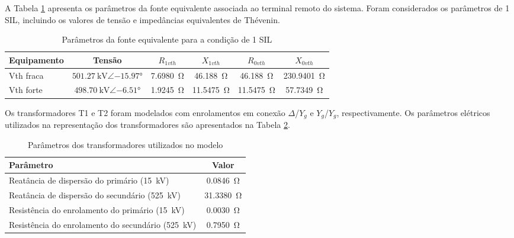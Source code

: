 A Tabela \ref{tab:parametros-fonte-equivalente} apresenta os parâmetros da fonte equivalente associada ao terminal remoto do sistema. Foram considerados os parâmetros de 1 SIL, incluindo os valores de tensão e impedâncias equivalentes de Thévenin.

\begin{table}[H]
  \centering
  \small
  \caption{Parâmetros da fonte equivalente para a condição de 1 SIL}
  \label{tab:parametros-fonte-equivalente}
  \begin{tabular}{lccccc}
    \toprule
    Equipamento & Tensão & $R_{1vth}$ & $X_{1vth}$ & $R_{0vth}$ & $X_{0vth}$ \\
    \midrule
    Vth fraca & $\SI{501,27}{\kilo\volt}\angle \ang{-15,97}$ & \SI{7,6980}{\ohm} & \SI{46,188}{\ohm} & \SI{46,188}{\ohm} & \SI{230,9401}{\ohm} \\
    Vth forte & $\SI{498,70}{\kilo\volt}\angle \ang{-6,51}$ & \SI{1,9245}{\ohm} & \SI{11,5475}{\ohm} & \SI{11,5475}{\ohm} & \SI{57,7349}{\ohm} \\
    \bottomrule
  \end{tabular}
\end{table}

Os transformadores T1 e T2 foram modelados com enrolamentos em conexão $\Delta$/$Y_g$ e $Y_g$/$Y_g$, respectivamente. Os parâmetros elétricos utilizados na representação dos transformadores são apresentados na Tabela \ref{tab:parametros-transformador}.

\begin{table}[H]
  \centering
  \small
  \caption{Parâmetros dos transformadores utilizados no modelo}
  \label{tab:parametros-transformador}
  \begin{tabular}{lc}
    \toprule
    Parâmetro & Valor \\
    \midrule
    Reatância de dispersão do primário (\SI{15}{\kilo\volt}) & \SI{0,0846}{\ohm} \\
    Reatância de dispersão do secundário (\SI{525}{\kilo\volt}) & \SI{31,3380}{\ohm} \\
    Resistência do enrolamento do primário (\SI{15}{\kilo\volt}) & \SI{0,0030}{\ohm} \\
    Resistência do enrolamento do secundário (\SI{525}{\kilo\volt}) & \SI{0,7950}{\ohm} \\
    \bottomrule
  \end{tabular}
\end{table}

